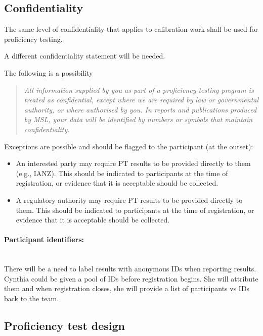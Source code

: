 \subsection{Confidentiality}
The same level of confidentiality that applies to calibration work shall be used for proficiency testing. 

A different confidentiality statement will be needed. 

The following is a possibility
\begin{quote}
\it
All information supplied by you as part of a proficiency testing program is treated as confidential, except where we are required by law or governmental authority, or where authorised by you. In reports and publications produced by MSL, your data will be identified by numbers or symbols that maintain confidentiality.
\end{quote}

Exceptions are possible and should be flagged to the participant (at the outset):
\begin{itemize}
\item	An interested party may require PT results to be provided directly to them (e.g., IANZ). This should be indicated to participants at the time of registration, or evidence that it is acceptable should be collected.
\item	A regulatory authority may require PT results to be provided directly to them. This should be indicated to participants at the time of registration, or evidence that it is acceptable should be collected.

\end{itemize}


\paragraph{Participant identifiers:}\mbox{}\\
There will be a need to label results with anonymous IDs when reporting results. Cynthia could be given a pool of IDs before registration begins. She will attribute them and when registration closes, she will provide a list of participants vs IDs back to the team.

\subsection{Proficiency test design}

